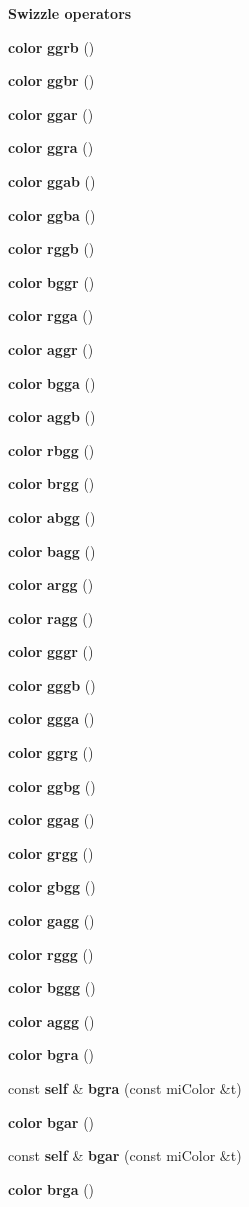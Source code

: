 \begin{Indent}{\bf Swizzle operators}
\begin{CompactItemize}
\item 
{\bf color} {\bf ggrb} ()
\item 
{\bf color} {\bf ggbr} ()
\item 
{\bf color} {\bf ggar} ()
\item 
{\bf color} {\bf ggra} ()
\item 
{\bf color} {\bf ggab} ()
\item 
{\bf color} {\bf ggba} ()
\item 
{\bf color} {\bf rggb} ()
\item 
{\bf color} {\bf bggr} ()
\item 
{\bf color} {\bf rgga} ()
\item 
{\bf color} {\bf aggr} ()
\item 
{\bf color} {\bf bgga} ()
\item 
{\bf color} {\bf aggb} ()
\item 
{\bf color} {\bf rbgg} ()
\item 
{\bf color} {\bf brgg} ()
\item 
{\bf color} {\bf abgg} ()
\item 
{\bf color} {\bf bagg} ()
\item 
{\bf color} {\bf argg} ()
\item 
{\bf color} {\bf ragg} ()
\item 
{\bf color} {\bf gggr} ()
\item 
{\bf color} {\bf gggb} ()
\item 
{\bf color} {\bf ggga} ()
\item 
{\bf color} {\bf ggrg} ()
\item 
{\bf color} {\bf ggbg} ()
\item 
{\bf color} {\bf ggag} ()
\item 
{\bf color} {\bf grgg} ()
\item 
{\bf color} {\bf gbgg} ()
\item 
{\bf color} {\bf gagg} ()
\item 
{\bf color} {\bf rggg} ()
\item 
{\bf color} {\bf bggg} ()
\item 
{\bf color} {\bf aggg} ()
\item 
{\bf color} {\bf bgra} ()
\item 
const {\bf self} \& {\bf bgra} (const mi\-Color \&t)
\item 
{\bf color} {\bf bgar} ()
\item 
const {\bf self} \& {\bf bgar} (const mi\-Color \&t)
\item 
{\bf color} {\bf brga} ()

\end{CompactItemize}
\end{Indent}
